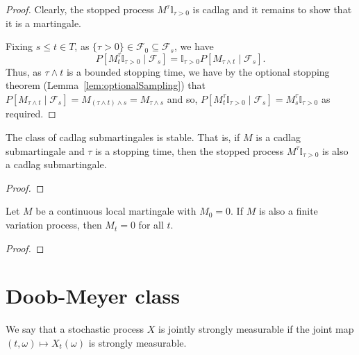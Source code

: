 \begin{proof}
  \leanok
  Clearly, the stopped process $M^{\tau}\mathbb{I}_{\tau > 0}$ is cadlag and it remains to show that it is a martingale.

  Fixing $s \le t \in T$, as $\{\tau > 0\} \in \mathcal{F}_0 \subseteq \mathcal{F}_s$, we have
  $$P[M^{\tau}_t \mathbb{I}_{\tau > 0} \mid \mathcal{F}_s] = \mathbb{I}_{\tau > 0}P[M_{\tau \wedge t} \mid \mathcal{F}_{s}].$$
  Thus, as $\tau \wedge t$ is a bounded stopping time, we have by the optional stopping theorem
  (Lemma~\ref{lem:optionalSampling}) that $P[M_{\tau \wedge t} \mid \mathcal{F}_{s}] = M_{(\tau \wedge t) \wedge s} = M_{\tau \wedge s}$
  and so, $P[M^{\tau}_t \mathbb{I}_{\tau > 0} \mid \mathcal{F}_s] = M^{\tau}_s \mathbb{I}_{\tau > 0}$ as required.
\end{proof}


\begin{lemma}\label{lem:stable_IsSubmartingale}
  \leanok
The class of cadlag submartingales is stable. That is, if $M$ is a cadlag submartingale and $\tau$ is a stopping time, then the stopped process $M^{\tau}\mathbb{I}_{\tau > 0}$ is also a cadlag submartingale.
\end{lemma}

\begin{proof}

\end{proof}


\begin{theorem}\label{thm:IsLocalMartingale.eq_zero_of_finiteVariation}
Let $M$ be a continuous local martingale with $M_0 = 0$. If $M$ is also a finite variation process, then $M_t = 0$ for all $t$.
\end{theorem}

\begin{proof}

\end{proof}



\section{Doob-Meyer class}

\begin{definition}\label{def:JointlyStronglyMeasurable}
  \leanok
We say that a stochastic process $X$ is jointly strongly measurable
if the joint map $(t, \omega) \mapsto X_t(\omega)$ is strongly measurable.
\end{definition}


